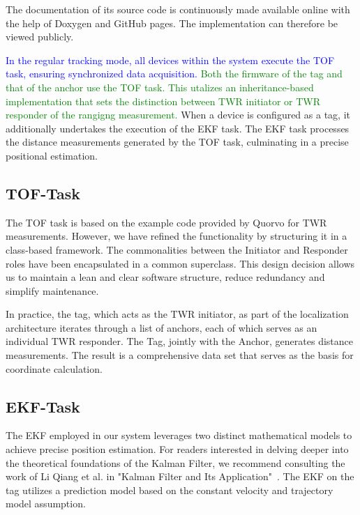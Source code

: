 \documentclass[conference, a4paper]{IEEEtran}
\begin{document}
The documentation of its source code is continuously made available online with the help of Doxygen and GitHub pages.
The implementation can therefore be viewed publicly\cite{doxygen-doku}.

\textcolor{blue}{In the regular tracking mode, all devices within the system execute the \ac{TOF} task, ensuring synchronized data acquisition.
}
\textcolor{green}{Both the firmware of the tag and that of the anchor use the \ac{TOF} task. This utalizes an inheritance-based implementation that sets the distinction between \ac{TWR} initiator or \ac{TWR} responder of the rangigng measurement.}
When a device is configured as a tag,
it additionally undertakes the execution of the \ac{EKF} task.
The \ac{EKF} task processes the distance measurements generated by the \ac{TOF} task,
culminating in a precise positional estimation.

\subsection{TOF-Task}\label{section:firmware-tof}
The \ac{TOF} task is based on the example code
provided by Quorvo for \ac{TWR} measurements.
However, we have refined the functionality by structuring it in a class-based framework.
The commonalities between the Initiator and Responder roles have been
encapsulated in a common superclass.
This design decision allows us to maintain a lean and clear software structure,
reduce redundancy and simplify maintenance.

In practice, the tag, which acts as the \ac{TWR} initiator, as part of the localization architecture iterates through a list of anchors, each of which serves as an individual \ac{TWR} responder. 
The Tag, jointly with the Anchor, generates distance measurements. 
The result is a comprehensive data set that serves as the basis for coordinate calculation. 

\subsection{EKF-Task}\label{section:firmware-ekf}
The \ac{EKF} employed in our system leverages two distinct mathematical models
to achieve precise position estimation.
For readers interested in delving deeper into the theoretical foundations of the
Kalman Filter, we recommend consulting the work of Li Qiang et al. in
"Kalman Filter and Its Application"~\cite{Kalman}.
The EKF  on the tag utilizes a prediction model based on the constant velocity and trajectory model assumption.
\end{document}
